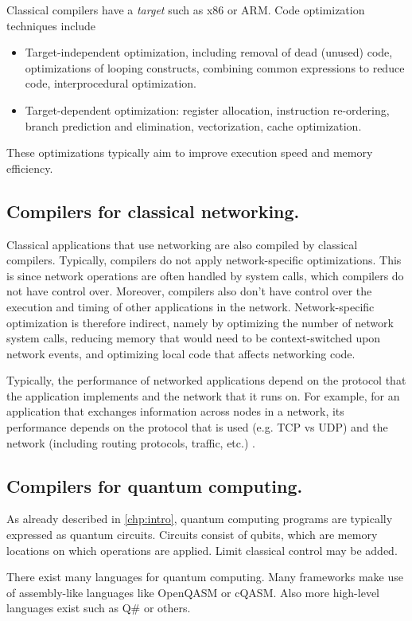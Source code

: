 Classical compilers have a \textit{target} such as x86 or ARM.
Code optimization techniques include
\begin{itemize}
  \item Target-independent optimization, including removal of dead (unused) code, optimizations of looping constructs, combining common expressions to reduce code, interprocedural optimization.
  \item Target-dependent optimization: register allocation, instruction re-ordering, branch prediction and elimination, vectorization, cache optimization.
\end{itemize}
These optimizations typically aim to improve execution speed and memory efficiency.

\subsection{Compilers for classical networking.}
Classical applications that use networking are also compiled by classical compilers.
Typically, compilers do not apply network-specific optimizations.
This is since network operations are often handled by system calls, which compilers do not have control over.
Moreover, compilers also don't have control over the execution and timing of other applications in the network.
Network-specific optimization is therefore indirect, namely by optimizing the number of network system calls, reducing memory that would need to be context-switched upon network events, and optimizing local code that affects networking code.

Typically, the performance of networked applications depend on the protocol that the application implements and the network that it runs on.
For example, for an application that exchanges information across nodes in a network, its performance depends on the protocol that is used (e.g. TCP vs UDP) and the network (including routing protocols, traffic, etc.) .

\subsection{Compilers for quantum computing.}
As already described in \cref{chp:intro}, quantum computing programs are typically expressed as quantum circuits.
Circuits consist of qubits, which are memory locations on which operations are applied.
Limit classical control may be added.

There exist many languages for quantum computing.
Many frameworks make use of assembly-like languages like OpenQASM or cQASM.
Also more high-level languages exist such as Q\# or others.

